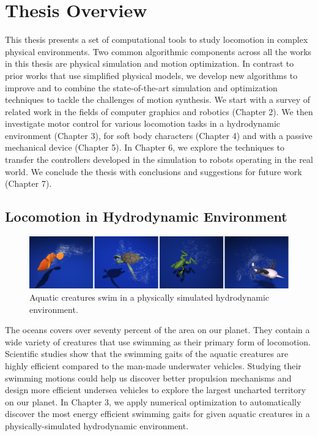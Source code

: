 \section{Thesis Overview}

This thesis presents a set of computational tools to study locomotion in complex physical environments. Two common algorithmic components across all the works in this thesis are physical simulation and motion optimization. In contrast to prior works that use simplified physical models, we develop new algorithms to improve and to combine the state-of-the-art simulation and optimization techniques to tackle the challenges of motion synthesis. We start with a survey of related work in the fields of computer graphics and robotics (Chapter 2). We then investigate motor control for various locomotion tasks in a hydrodynamic environment (Chapter 3), for soft body characters (Chapter 4) and with a passive mechanical device (Chapter 5). In Chapter 6, we explore the techniques to transfer the controllers developed in the simulation to robots operating in the real world. We conclude the thesis with conclusions and suggestions for future work (Chapter 7).

\subsection{Locomotion in Hydrodynamic Environment}



\begin{figure}[!h]
  \centering
    \includegraphics[width=\textwidth]{figures/teaserSwimming.eps}
  \caption{Aquatic creatures swim in a physically simulated hydrodynamic environment.}
  \label{fig:teaser1}
\end{figure}

The oceans covers over seventy percent of the area on our planet. They contain a wide variety of creatures that use swimming as their primary form of locomotion. Scientific studies show that the swimming gaits of the aquatic creatures are highly efficient compared to the man-made underwater vehicles. Studying their swimming motions could help us discover better propulsion mechanisms and design more efficient undersea vehicles to explore the largest uncharted territory on our planet. In Chapter 3, we apply numerical optimization to automatically discover the most energy efficient swimming gaits for given aquatic creatures in a physically-simulated hydrodynamic environment.

